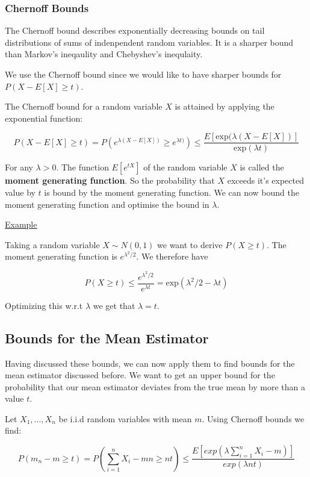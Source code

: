 \documentclass[12pt, authoryear]{elsarticle}
\begin{document}
\subsubsection{Chernoff Bounds}\label{chernoff}

The Chernoff bound describes exponentially decreasing bounds on tail distributions of sums of indenpendent random variables. It is a sharper bound than Markov's ineqaulity and Chebyshev's inequlaity. 

We use the Chernoff bound since we would like to have sharper bounds for $ P( X - E[X] \geq t) $. 

The Chernoff bound for a random variable $X$ is attained by applying the exponential function:

$$ P( X - E[X] \geq t )  = P( e^{\lambda(X- E[X])} \geq e^{\lambda t)}) \leq \frac{E [\text{exp}(\lambda(X- E[X])]}{\text{exp}(\lambda t)}$$

For any $\lambda > 0 $.  The function $E[e^{tX}]$ of the random variable $X$ is called the \textbf{moment generating function}.  So the probability that $X$ exceeds it's expected value by $t$ is bound by the moment generating function. We can now bound the moment generating function and optimise the bound in $\lambda$. 

\underline{Example} 

Taking a random variable $X \sim N(0,1) $ we want to derive $P(X \geq t)$. The moment generating function is $e^{\lambda^2 / 2}$. We therefore have 

$$ P(X \geq t) \leq \frac{e^{\lambda ^2 / 2}}{e^{\lambda t}} = \text{exp}(\lambda^2 / 2 - \lambda t)$$

Optimizing this w.r.t $\lambda$ we get that $\lambda = t$.


\subsection{Bounds for the Mean Estimator}

Having discussed these bounds, we can now apply them to find bounds for the mean estimator discussed before. We want to get an upper bound for the probability that our mean estimator deviates from the true mean by more than a value $t$. 

Let $X_1, ... , X_n$ be i.i.d random variables with mean $m$. Using Chernoff bounds we find:

$$ P(m_n - m \geq t) = P(\sum_{i=1}^n X_i - mn \geq nt) \leq \frac{E[exp(\lambda\sum_{i=1}^n X_i - m)]}{exp(\lambda nt)}$$
\end{document}
